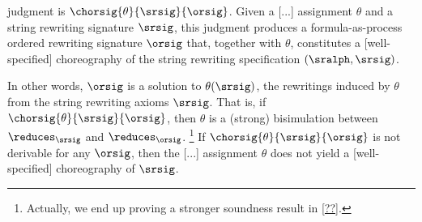  judgment is $\chorsig{\theta}{\srsig}{\orsig}$.
Given a [...] assignment $\theta$ and a string rewriting signature $\srsig$, this judgment produces a formula-as-process ordered rewriting signature $\orsig$ that, together with $\theta$, constitutes a [well-specified] choreography of the string rewriting specification $(\sralph, \srsig)$.

In other words, $\orsig$ is a solution to $\theta(\srsig)$, the rewritings induced by $\theta$ from the string rewriting axioms $\srsig$.
That is, if $\chorsig{\theta}{\srsig}{\orsig}$, then $\theta$ is a (strong) bisimulation between $\reduces_{\srsig}$ and $\reduces_{\orsig}$.
\footnote{%
  Actually, we end up proving a stronger soundness result in \cref{??}.}
%
If $\chorsig{\theta}{\srsig}{\orsig}$ is not derivable for any $\orsig$, then the [...] assignment $\theta$ does not yield a [well-specified] choreography of $\srsig$.


